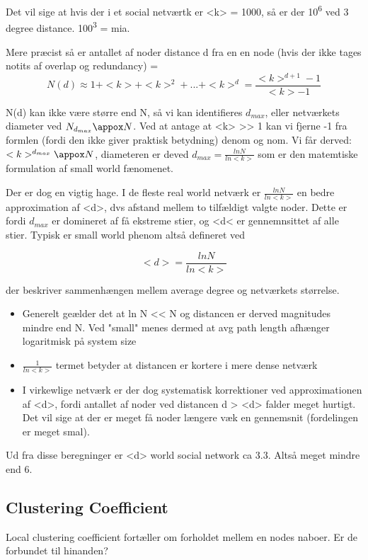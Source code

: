 \documentclass[11pt]{article}
\begin{document}
Det vil sige at hvis der i et social netværtk er <k> = 1000, så er der 10\textsuperscript{6} ved 3 degree distance. 100\textsuperscript{3} = mia. 

Mere præcist så er antallet af noder distance d fra en en node (hvis der ikke tages notits af overlap og redundancy) = $$ N(d) \approx 1 + <k> + <k>^2 + ... + <k>^d = \frac{<k>^{d+1} -1}{<k> - 1} $$

N(d) kan ikke være større end N, så vi kan identifieres \(d_{max}\), eller netværkets diameter ved \(N_{d_{max}} \appox N\). Ved at antage at <k> >> 1 kan vi fjerne -1 fra formlen (fordi den ikke giver praktisk betydning) denom og nom. Vi får derved: \(<k>^{d_{max}} \appox N\), diameteren er deved \(d_{max} = \frac{ln N}{ln <k>}\) som er den matemtiske formulation af small world fænomenet. 


Der er dog en vigtig hage. I de fleste real world netværk er \(\frac{ln N}{ln <k>}\) en bedre approximation af <d>, dvs afstand mellem to tilfældigt valgte noder. Dette er fordi \(d_{max}\) er domineret af få ekstreme stier, og <d< er gennemnsittet af alle stier. Typisk er small world phenom altså defineret ved 

$$ <d> = \frac{ln N}{ln <k>} $$

der beskriver sammenhængen mellem average degree og netværkets størrelse.

\begin{itemize}
\item Generelt geælder det at ln N << N og distancen er derved magnitudes mindre end N. Ved "small" menes dermed at avg path length afhænger logaritmisk på system size
\item \(\frac{1}{ln <k>}\) termet betyder at distancen er kortere i mere dense netværk
\item I virkewlige netværk er der dog systematisk korrektioner ved approximationen af <d>, fordi antallet af noder ved distancen d > <d> falder meget hurtigt. Det vil sige at der er meget få noder længere væk en gennemsnit (fordelingen er meget smal).
\end{itemize}

Ud fra disse beregninger er <d> world social network ca 3.3. Altså meget mindre end 6.

\subsection{Clustering Coefficient}
\label{sec:org838e965}
Local clustering coefficient fortæller om forholdet mellem en nodes naboer. Er de forbundet til hinanden?
\end{document}
